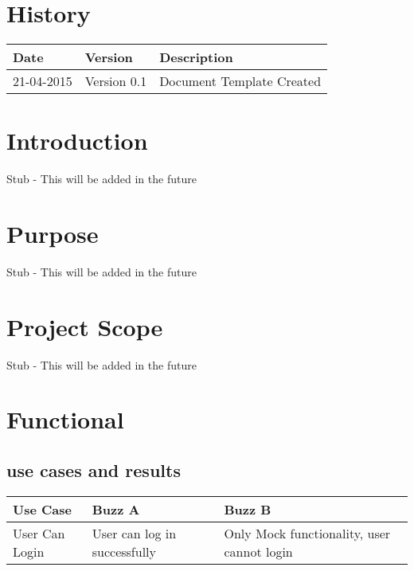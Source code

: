 \documentclass[12pt]{article}
\begin{document}


\section{History}
\begin{tabular}{|l|l|l|}

\hline
Date & Version & Description\\ %
\hline
21-04-2015 & Version 0.1 & Document Template Created\\ %



\end{tabular}

\newpage
\tableofcontents
\newpage

\section{Introduction} %
Stub - This will be added in the future

\section{Purpose} %
Stub - This will be added in the future


\section{Project Scope} %
Stub - This will be added in the future

\section{Functional} %
\subsection{use cases and results}
\begin{tabular}{|l|l|l|}

\hline
Use Case & Buzz A & Buzz B \\ %
\hline
User Can Login & User can log in successfully & Only Mock functionality, user cannot login\\ %



\end{tabular}
\end{document}
